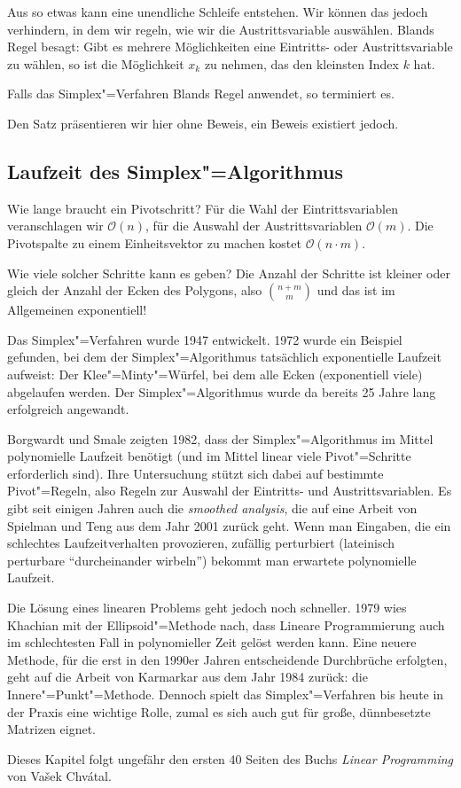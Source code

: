 Aus so etwas kann eine unendliche Schleife entstehen. Wir können das jedoch verhindern, in dem wir regeln, wie wir die Austrittsvariable auswählen. Blands Regel besagt: Gibt es mehrere Möglichkeiten eine Eintritts- oder Austrittsvariable zu wählen, so ist die Möglichkeit $x_k$ zu nehmen, das den kleinsten Index $k$ hat.

\begin{Satz}
  \hspace{\parindent}Falls das Simplex"=Verfahren Blands Regel anwendet, so terminiert es.
\end{Satz}

Den Satz präsentieren wir hier ohne Beweis, ein Beweis existiert jedoch.

\subsection{Laufzeit des Simplex"=Algorithmus}
Wie lange braucht ein Pivotschritt? Für die Wahl der Eintrittsvariablen veranschlagen wir $\mathcal{O}(n)$, für die Auswahl der Austrittsvariablen $\mathcal{O}(m)$. Die Pivotspalte zu einem Einheitsvektor zu machen kostet $\mathcal{O}(n \cdot m)$.

Wie viele solcher Schritte kann es geben? Die Anzahl der Schritte ist kleiner oder gleich der Anzahl der Ecken des Polygons, also $\binom{n+m}{m}$ und das ist im Allgemeinen exponentiell!

Das Simplex"=Verfahren wurde 1947 entwickelt. 1972 wurde ein Beispiel gefunden, bei dem der Simplex"=Algorithmus tatsächlich exponentielle Laufzeit aufweist: Der Klee"=Minty"=Würfel, bei dem alle Ecken (exponentiell viele) abgelaufen werden. Der Simplex"=Algorithmus wurde da bereits 25 Jahre lang erfolgreich angewandt. %

Borgwardt und Smale zeigten 1982, dass der Simplex"=Algorithmus im Mittel polynomielle Laufzeit benötigt (und im Mittel linear viele Pivot"=Schritte erforderlich sind). Ihre Untersuchung stützt sich dabei auf bestimmte Pivot"=Regeln, also Regeln zur Auswahl der Eintritts- und Austrittsvariablen. Es gibt seit einigen Jahren auch die \textit{smoothed analysis}, die auf eine Arbeit von Spielman und Teng aus dem Jahr 2001 zurück geht. Wenn man Eingaben, die ein schlechtes Laufzeitverhalten provozieren, zufällig perturbiert (lateinisch perturbare "`durcheinander wirbeln"') bekommt man erwartete polynomielle Laufzeit.

Die Lösung eines linearen Problems geht jedoch noch schneller. 1979 wies Khachian mit der Ellipsoid"=Methode nach, dass Lineare Programmierung auch im schlechtesten Fall in polynomieller Zeit gelöst werden kann. Eine neuere Methode, für die erst in den 1990er Jahren entscheidende Durchbrüche erfolgten, geht auf die Arbeit von Karmarkar aus dem Jahr 1984 zurück: die Innere"=Punkt"=Methode. Dennoch spielt das Simplex"=Verfahren bis heute in der Praxis eine wichtige Rolle, zumal es sich auch gut für große, dünnbesetzte Matrizen eignet.

Dieses Kapitel folgt ungefähr den ersten 40 Seiten des Buchs \textit{Linear Programming} von Va\v{s}ek Chv\'{a}tal.
